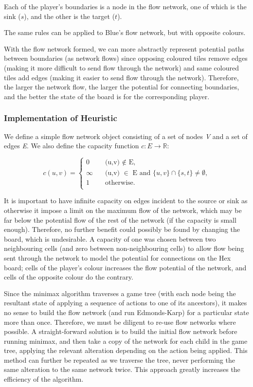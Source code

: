 Each of the player's boundaries is a node in the flow network, one of which is the sink ($s$), and the other is the target ($t$).

The same rules can be applied to Blue's flow network, but with opposite colours.


With the flow network formed, we can more abstractly represent potential paths between boundaries (as network flows) since opposing coloured tiles remove edges (making it more difficult to send flow through the network) and same coloured tiles add edges (making it easier to send flow through the network). Therefore, the larger the network flow, the larger the potential for connecting boundaries, and the better the state of the board is for the corresponding player.

\subsubsection{Implementation of Heuristic}

We define a simple flow network object consisting of a set of nodes \textit{V} and a set of edges \textit{E}. We also define the capacity function $c: \textit{E} \to \mathbb{R}$:

 \[
 c(u,v) = \begin{cases}
                        \text{0} &\quad\text{(u,v) $\notin$ E,}\\
                        \text{$\infty$} &\quad\text{(u,v) $\in$ E and $\{u,v\} \cap \{s,t\} \neq \emptyset$,}\\
                        \text{1} &\quad\text{otherwise.}\\
            \end{cases}
\]


It is important to have infinite capacity on edges incident to the source or sink as otherwise it impose a limit on the maximum flow of the network, which may be far below the potential flow of the rest of the network (if the capacity is small enough). Therefore, no further benefit could possibly be found by changing the board, which is undesirable. A capacity of one was chosen between two neighbouring cells (and zero between non-neighbouring cells) to allow flow being sent through the network to model the potential for connections on the Hex board; cells of the player's colour increases the flow potential of the network, and cells of the opposite colour do the contrary.



Since the minimax algorithm traverses a game tree (with each node being the resultant state of applying a sequence of actions to one of its ancestors), it makes no sense to build the flow network (and run Edmonds-Karp) for a particular state more than once. Therefore, we must be diligent to re-use flow networks where possible. A straight-forward solution is to build the initial flow network before running minimax, and then take a copy of the network for each child in the game tree, applying the relevant alteration depending on the action being applied. This method can further be repeated as we traverse the tree, never performing the same alteration to the same network twice. This approach greatly increases the efficiency of the algorithm.


